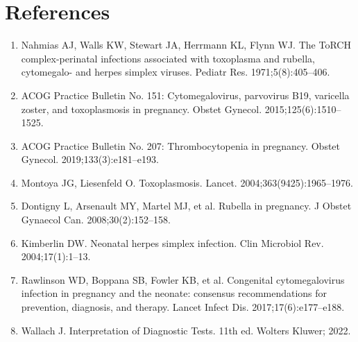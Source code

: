 \section*{References}
\begin{enumerate}
  \item Nahmias AJ, Walls KW, Stewart JA, Herrmann KL, Flynn WJ. The ToRCH complex-perinatal infections associated with toxoplasma and rubella, cytomegalo- and herpes simplex viruses. Pediatr Res. 1971;5(8):405--406.
  \item ACOG Practice Bulletin No. 151: Cytomegalovirus, parvovirus B19, varicella zoster, and toxoplasmosis in pregnancy. Obstet Gynecol. 2015;125(6):1510--1525.
  \item ACOG Practice Bulletin No. 207: Thrombocytopenia in pregnancy. Obstet Gynecol. 2019;133(3):e181--e193.
  \item Montoya JG, Liesenfeld O. Toxoplasmosis. Lancet. 2004;363(9425):1965--1976.
  \item Dontigny L, Arsenault MY, Martel MJ, et al. Rubella in pregnancy. J Obstet Gynaecol Can. 2008;30(2):152--158.
  \item Kimberlin DW. Neonatal herpes simplex infection. Clin Microbiol Rev. 2004;17(1):1--13.
  \item Rawlinson WD, Boppana SB, Fowler KB, et al. Congenital cytomegalovirus infection in pregnancy and the neonate: consensus recommendations for prevention, diagnosis, and therapy. Lancet Infect Dis. 2017;17(6):e177--e188.
  \item Wallach J. Interpretation of Diagnostic Tests. 11th ed. Wolters Kluwer; 2022.
\end{enumerate}

\clearpage
